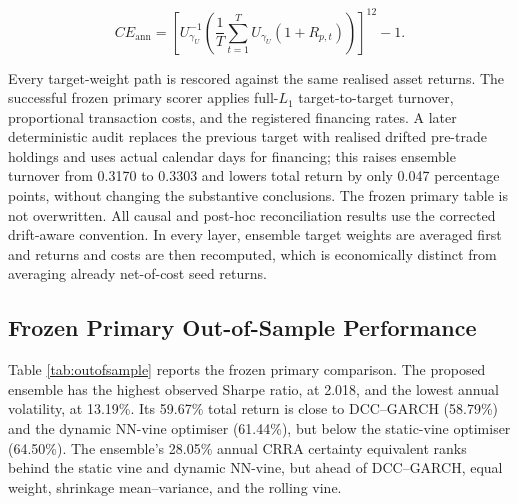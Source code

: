 \begin{equation}
CE_{\mathrm{ann}}=
\left[U_{\gamma_U}^{-1}\left(\frac{1}{T}\sum_{t=1}^{T}
U_{\gamma_U}(1+R_{p,t})\right)\right]^{12}-1.
\label{eq:certainty_equivalent}
\end{equation}

Every target-weight path is rescored against the same realised asset returns. The successful frozen primary scorer applies full-$L_1$ target-to-target turnover, proportional transaction costs, and the registered financing rates. A later deterministic audit replaces the previous target with realised drifted pre-trade holdings and uses actual calendar days for financing; this raises ensemble turnover from 0.3170 to 0.3303 and lowers total return by only 0.047 percentage points, without changing the substantive conclusions. The frozen primary table is not overwritten. All causal and post-hoc reconciliation results use the corrected drift-aware convention. In every layer, ensemble target weights are averaged first and returns and costs are then recomputed, which is economically distinct from averaging already net-of-cost seed returns.

\subsection{Frozen Primary Out-of-Sample Performance}
\label{subsec:4_outofsample}

Table \ref{tab:outofsample} reports the frozen primary comparison. The proposed ensemble has the highest observed Sharpe ratio, at 2.018, and the lowest annual volatility, at 13.19\%. Its 59.67\% total return is close to DCC--GARCH (58.79\%) and the dynamic NN-vine optimiser (61.44\%), but below the static-vine optimiser (64.50\%). The ensemble's 28.05\% annual CRRA certainty equivalent ranks behind the static vine and dynamic NN-vine, but ahead of DCC--GARCH, equal weight, shrinkage mean--variance, and the rolling vine.

